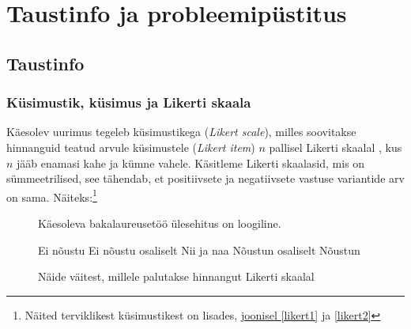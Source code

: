 \documentclass[a4paper,12pt]{article}
\numberwithin{equation}{section}
\theoremstyle{definition}
\begin{document}
\section{Taustinfo ja probleemipüstitus}

\subsection{Taustinfo}

\subsubsection{Küsimustik, küsimus ja Likerti skaala}

Käesolev uurimus tegeleb k\"usimustikega (\textit{Likert scale}), milles soovitakse hinnanguid teatud arvule küsimustele (\textit{Likert item}) $n$ pallisel Likerti skaalal \cite{Edmondson}, kus $n$ jääb enamasi kahe ja kümne vahele. Käsitleme Likerti skaalasid, mis on sümmeetrilised, see tähendab, et positiivsete ja negatiivsete vastuse variantide arv on sama. Näiteks:\footnote{Näited terviklikest k\"usimustikest on lisades, \hyperref[likert1]{joonisel \ref*{likert1}} ja \hyperref[likert2]{ \ref*{likert2}}}

\vspace{10pt}

\begin{figure}[H]


\colorbox{background_example}{\parbox{\textwidth}{

\vspace{1mm}

Käesoleva bakalaureusetöö \"ulesehitus on loogiline.

\vspace{5pt}

\begin{Form}
\def\DefaultWidthofChoiceMenu{12pt}%


\small{
	\CheckBox[bordercolor = gray,name=optionE]{\mbox{}} Ei nõustu 
	\CheckBox[bordercolor = gray,name=optionD]{\mbox{}} Ei nõustu osaliselt
	\CheckBox[bordercolor = gray,name=optionC]{\mbox{}} Nii ja naa
	\CheckBox[bordercolor = gray,name=optionC]{\mbox{}}  Nõustun osaliselt
	\CheckBox[checked,bordercolor = gray,name=optionC]{\mbox{}} Nõustun
}


\end{Form}}}
\caption{Näide väitest, millele palutakse hinnangut Likerti skaalal}
\label{likert_question}
\end{figure}
\end{document}
